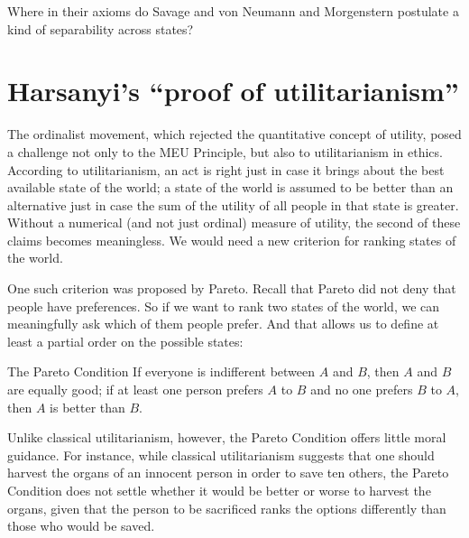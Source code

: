 \begin{exercise}{2}
  Where in their axioms do Savage and von Neumann and Morgenstern
  postulate a kind of separability across states?
\end{exercise}

\section{Harsanyi's ``proof of utilitarianism''}

The ordinalist movement, which rejected the quantitative concept of utility,
posed a challenge not only to the MEU Principle, but also to utilitarianism in
ethics. According to utilitarianism, an act is right just in case it brings
about the best available state of the world; a state of the world is assumed to
be better than an alternative just in case the sum of the utility of all people
in that state is greater. Without a numerical (and not just ordinal) measure of
utility, the second of these claims becomes meaningless. We would need a new
criterion for ranking states of the world.

One such criterion was proposed by Pareto. Recall that Pareto did not
deny that people have preferences. So if we want to rank two states of
the world, we can meaningfully ask which of them people prefer. And
that allows us to define at least a partial order on the possible
states:
%
\begin{genericthm}{The Pareto Condition}
  If everyone is indifferent between  $A$ and $B$, then $A$ and $B$
  are equally good; if at least one person prefers $A$ to $B$ and no
  one prefers $B$ to $A$, then $A$ is better than $B$.
\end{genericthm}
%

Unlike classical utilitarianism, however, the Pareto Condition offers
little moral guidance. For instance, while classical utilitarianism
suggests that one should harvest the organs of an innocent person in
order to save ten others, the Pareto Condition does not settle whether
it would be better or worse to harvest the organs, given that the
person to be sacrificed ranks the options differently than those who
would be saved.


